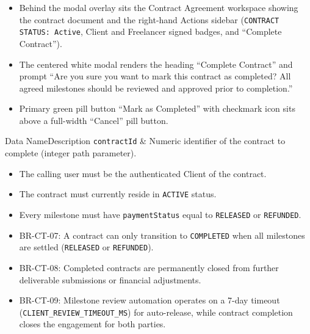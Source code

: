 \begin{itemize}[leftmargin=1.6em,topsep=3pt,itemsep=2pt,parsep=0pt,label=$\bullet$]
      \item Behind the modal overlay sits the Contract Agreement workspace showing the contract document and the right-hand Actions sidebar (\texttt{CONTRACT STATUS: Active}, Client and Freelancer signed badges, and ``Complete Contract'').
      \item The centered white modal renders the heading ``Complete Contract'' and prompt ``Are you sure you want to mark this contract as completed? All agreed milestones should be reviewed and approved prior to completion.''
      \item Primary green pill button ``Mark as Completed'' with checkmark icon sits above a full-width ``Cancel'' pill button.
\end{itemize}


\begin{specdatatable}{Data Name}{Description}
      \texttt{contractId} & Numeric identifier of the contract to complete (integer path parameter).\\ \hline
\end{specdatatable}

\begin{itemize}[leftmargin=1.6em,topsep=3pt,itemsep=2pt,parsep=0pt,label=$\bullet$]
      \item The calling user must be the authenticated Client of the contract.
      \item The contract must currently reside in \texttt{ACTIVE} status.
      \item Every milestone must have \texttt{paymentStatus} equal to \texttt{RELEASED} or \texttt{REFUNDED}.
\end{itemize}

\begin{itemize}[leftmargin=1.6em,topsep=3pt,itemsep=2pt,parsep=0pt,label=$\bullet$]\brrulelist
      \item BR-CT-07: A contract can only transition to \texttt{COMPLETED} when all milestones are settled (\texttt{RELEASED} or \texttt{REFUNDED}).
      \item BR-CT-08: Completed contracts are permanently closed from further deliverable submissions or financial adjustments.
      \item BR-CT-09: Milestone review automation operates on a 7-day timeout (\texttt{CLIENT\_\allowbreak{}REVIEW\_\allowbreak{}TIMEOUT\_\allowbreak{}MS}) for auto-release, while contract completion closes the engagement for both parties.
\end{itemize}

